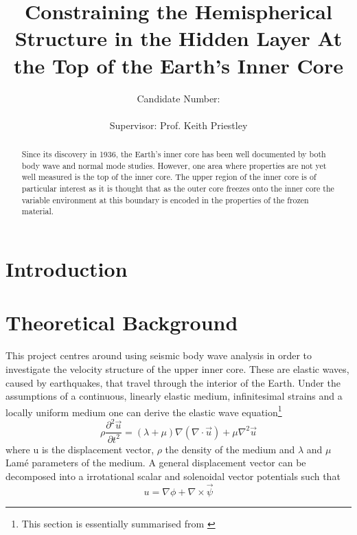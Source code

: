 \documentclass[11pt,a4paper]{article}
\begin{document}
\title{Constraining the Hemispherical Structure in the Hidden Layer At the Top of the Earth's Inner Core}
\author{Candidate Number: \\  \\ Supervisor: Prof. Keith Priestley}
\maketitle

\begin{abstract}
Since its discovery in 1936, the Earth's inner core has been well documented by both body wave and normal mode studies. However, one area where properties are not yet well measured is the top of the inner core. The upper region of the inner core is of particular interest as it is thought that as the outer core freezes onto the inner core the variable environment at this boundary is encoded in the properties of the frozen material. 
\end{abstract}

\newpage
\section{Introduction}

\section{Theoretical Background}
This project centres around using seismic body wave analysis in order to investigate the velocity structure of the upper inner core. These are elastic waves, caused by earthquakes, that travel through the interior of the Earth. Under the assumptions of a continuous, linearly elastic medium, infinitesimal strains and a locally uniform medium one can derive the elastic wave equation\footnote{This section is essentially summarised from \cite{Shearer2009}}
\begin{equation}
	\rho \frac{\partial^{2} \vec{u}}{\partial t^{2}} = \left ( \lambda + \mu \right ) \nabla \left ( \nabla \cdot \vec{u} \right ) + \mu \nabla^{2} \vec{u}
	\label{eq:Wave Equation}
\end{equation}
where u is the displacement vector, $\rho$ the density of the medium and $\lambda$ and $\mu$  Lam\'{e} parameters of the medium. A general displacement vector can be decomposed into a irrotational scalar and solenoidal vector potentials such that
\begin{equation}
	u = \nabla \phi + \nabla \times \vec{\psi}
	\label{eq:Displacement}
\end{equation}
\end{document}
